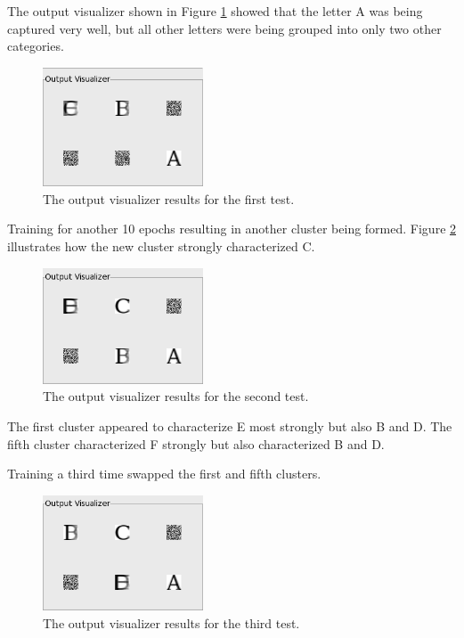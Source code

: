 \documentclass[12pt,letterpaper,oneside]{report}
\begin{document}
The output visualizer shown in Figure \ref{fig:first-test} showed that the letter A was being captured very well, but all other letters were being grouped into only two other categories.

\begin{figure}[ht]
\centering
  \includegraphics[width=180px]{diagrams/first-test.png} 
  \caption{The output visualizer results for the first test.}
  \label{fig:first-test}
\end{figure}

Training for another 10 epochs resulting in another cluster being formed. Figure \ref{fig:second-test} illustrates how the new cluster strongly characterized C.

\begin{figure}[ht]
\centering
  \includegraphics[width=180px]{diagrams/second-test.png} 
  \caption{The output visualizer results for the second test.}
  \label{fig:second-test}
\end{figure}

The first cluster appeared to characterize E most strongly but also B and D. The fifth cluster characterized F strongly but also characterized B and D.

Training a third time swapped the first and fifth clusters.

\begin{figure}[ht]
\centering
  \includegraphics[width=180px]{diagrams/third-test.png} 
  \caption{The output visualizer results for the third test.}
  \label{fig:third-test}
\end{figure}
\end{document}
